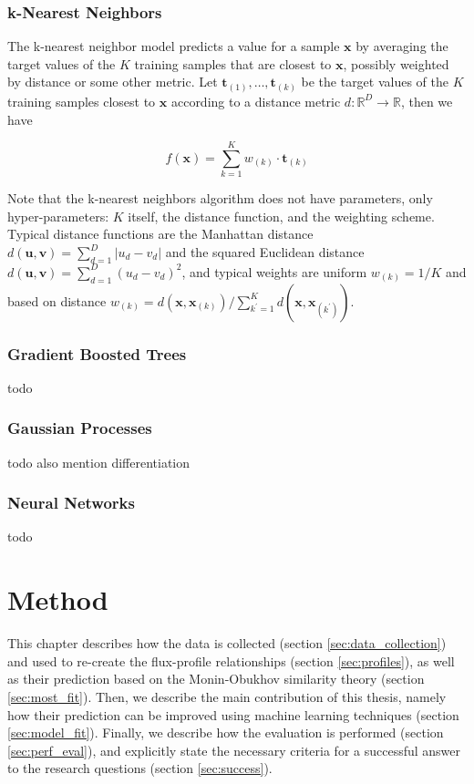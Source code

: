 \documentclass[12pt]{book}
\begin{document}
\subsection{k-Nearest Neighbors}
The k-nearest neighbor model \cite{knn} predicts a value for a sample $\bm x$ by averaging the target values of the $K$ training samples that are closest to $\bm x$, possibly weighted by distance or some other metric. Let $\bm t_{(1)},\ldots,\bm t_{(k)}$ be the target values of the $K$ training samples closest to $\bm x$ according to a distance metric $d:\mathbb{R}^D\rightarrow\mathbb{R}$, then we have

\begin{equation}
f(\bm x)=\sum_{k=1}^K w_{(k)}\cdot\bm t_{(k)}
\end{equation}


Note that the k-nearest neighbors algorithm does not have parameters, only hyper\hyp{}parameters: $K$ itself, the distance function, and the weighting scheme. Typical distance functions are the Manhattan distance $d(\bm u,\bm v)=\sum_{d=1}^D\vert u_d-v_d\vert$ and the squared Euclidean distance $d(\bm u,\bm v)=\sum_{d=1}^D(u_d-v_d)^2$, and typical weights are uniform $w_{(k)}=1/K$ and based on distance $w_{(k)}=d(\bm x,\bm x_{(k)})/\sum_{k^\prime=1}^K d(\bm x,\bm x_{(k^\prime)})$.

\subsection{Gradient Boosted Trees}
todo

\subsection{Gaussian Processes}
todo also mention differentiation

\subsection{Neural Networks}
todo

\chapter{Method}
This chapter describes how the data is collected (section \ref{sec:data_collection}) and used to re-create the flux-profile relationships (section \ref{sec:profiles}), as well as their prediction based on the Monin-Obukhov similarity theory (section \ref{sec:most_fit}). Then, we describe the main contribution of this thesis, namely how their prediction can be improved using machine learning techniques (section \ref{sec:model_fit}). Finally, we describe how the evaluation is performed (section \ref{sec:perf_eval}), and explicitly state the necessary criteria for a successful answer to the research questions (section  \ref{sec:success}).
\end{document}
